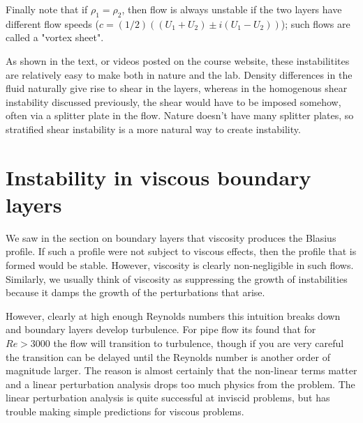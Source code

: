 \documentclass[11pt]{article}
\begin{document}
Finally note that if $\rho_1 = \rho_2$, then flow is always unstable if the two layers have different flow speeds ($c = (1/2)\left((U_1 + U_2)\pm i(U_1-U_2)\right)$); such flows are called a "vortex sheet".  

As shown in the text, or videos posted on the course website, these instabilitites are relatively easy to make both in nature and the lab.  Density differences in the fluid naturally give rise to shear in the layers, whereas in the homogenous shear instability discussed previously, the shear would have to be imposed somehow, often via a splitter plate in the flow.  Nature doesn't have many splitter plates, so stratified shear instability is a more natural way to create instability.  

\section{Instability in viscous boundary layers}

We saw in the section on boundary layers that viscosity produces the Blasius profile.  If such a profile were not subject to viscous effects, then the profile that is formed would be stable.  However, viscosity is clearly non-negligible in such flows.  Similarly, we usually think of viscosity as suppressing the growth of instabilities because it damps the growth of the perturbations that arise.

However, clearly at high enough Reynolds numbers this intuition breaks down and boundary layers develop turbulence.  For pipe flow its found that for $Re>3000$ the flow will transition to turbulence, though if you are very careful the transition can be delayed until the Reynolds number is another order of magnitude larger.  The reason is almost certainly that the non-linear terms matter and a linear perturbation analysis drops too much physics from the problem.   The linear perturbation analysis is quite successful at inviscid problems, but has trouble making simple predictions for viscous problems. 
\end{document}
